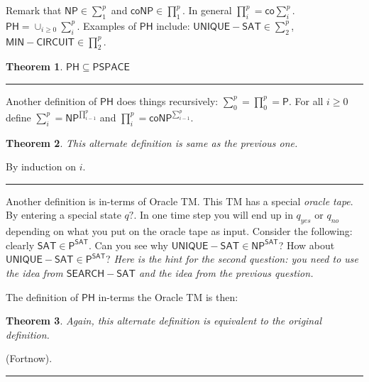 \documentclass[twoside]{article}
\newcounter{lecnum}
\newtheorem{theorem}{Theorem}[lecnum]
\newenvironment{proof}{{\bf Proof:}}{\hfill\rule{2mm}{2mm}}
\def\P{\mathsf{P}}
\def\NP{\mathsf{NP}}
\def\coNP{\mathsf{coNP}}
\def\PH{\mathsf{PH}}
\def\SAT{\mathsf{SAT}}
\def\PSPACE{\mathsf{PSPACE}}
\begin{document}
Remark that $\NP \in \sum_{1}^{p}$ and $\coNP \in \prod_{1}^{p}$. In general $\prod_{i}^{p} =\mathsf{co}\sum_{i}^{p}$. $\PH = \cup_{i\geq 0}\sum_{i}^{p}$. Examples of $\PH$ include: $\mathsf{UNIQUE-SAT} \in \sum_{2}^{p}$, $\mathsf{MIN-CIRCUIT} \in \prod_{2}^{p}$. 
\begin{theorem}
$\PH \subseteq \PSPACE$
\end{theorem}
\begin{proof}

\end{proof}

Another definition of $\PH$ does things recursively: $\sum_{0}^{p} = \prod_{0}^{p} = \P$. For all $i \geq 0$ define $\sum_{i}^{p} = \NP^{\prod_{i-1}^{p}}$ and $\prod_{i}^{p} = \coNP^{\sum_{i-1}^{p}}$.

\begin{theorem}
This alternate definition is same as the previous one. 
\end{theorem}
\begin{proof}
By induction on $i$. 
\end{proof}

Another definition is in-terms of Oracle TM. This TM has a special \emph{oracle tape}. By entering a special state $q?$. In one time step you will end up in $q_{yes}$ or $q_{no}$ depending on what you put on the oracle tape as input. Consider the following: clearly $\SAT \in \P^{\SAT}$. Can you see why $\mathsf{UNIQUE-SAT} \in \NP^{\SAT}$? How about $\mathsf{UNIQUE-SAT} \in \P^{\SAT}$? \emph{Here is the hint for the second question: you need to use the idea from $\mathsf{SEARCH-SAT}$ and the idea from the previous question.}

The definition of $\PH$ in-terms the Oracle TM is then:

\begin{theorem}
Again, this alternate definition is equivalent to the original definition.
\end{theorem} 

\begin{proof}
(Fortnow).
\end{proof}
\end{document}
